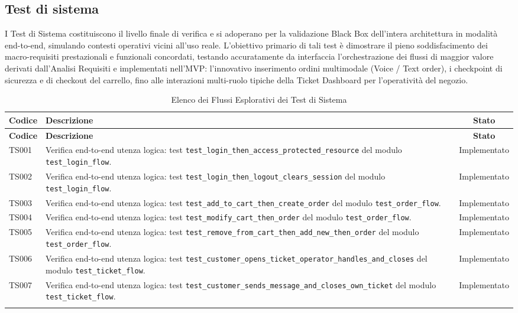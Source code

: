\documentclass[a4paper,11pt,oneside]{scrartcl}
\begin{document}
\subsection{Test di sistema}
I Test di Sistema costituiscono il livello finale di verifica e si adoperano per la validazione Black Box dell'intera architettura in modalità end-to-end, simulando contesti operativi vicini all'uso reale. L'obiettivo primario di tali test è dimostrare il pieno soddisfacimento dei macro-requisiti prestazionali e funzionali concordati, testando accuratamente da interfaccia l'orchestrazione dei flussi di maggior valore derivati dall'Analisi Requisiti e implementati nell'MVP: l'innovativo inserimento ordini multimodale (Voice / Text order), i checkpoint di sicurezza e di checkout del carrello, fino alle interazioni multi-ruolo tipiche della Ticket Dashboard per l'operatività del negozio.
\begin{longtable}{|p{1.9cm}|p{11.6cm}|c|}
    \hline
    \rowcolor[gray]{0.9}
    \textbf{Codice} & \textbf{Descrizione}                                                                                                                                            & \textbf{Stato} \\
    \hline
    \endfirsthead
    \hline
    \rowcolor[gray]{0.9}
    \textbf{Codice} & \textbf{Descrizione}                                                                                                                                            & \textbf{Stato} \\
    \hline
    \endhead
        TS001 & Verifica end-to-end utenza logica: test \texttt{test\_login\_then\_access\_protected\_resource} del modulo \texttt{test\_login\_flow}. & Implementato \\ \hline
    TS002 & Verifica end-to-end utenza logica: test \texttt{test\_login\_then\_logout\_clears\_session} del modulo \texttt{test\_login\_flow}. & Implementato \\ \hline
    TS003 & Verifica end-to-end utenza logica: test \texttt{test\_add\_to\_cart\_then\_create\_order} del modulo \texttt{test\_order\_flow}. & Implementato \\ \hline
    TS004 & Verifica end-to-end utenza logica: test \texttt{test\_modify\_cart\_then\_order} del modulo \texttt{test\_order\_flow}. & Implementato \\ \hline
    TS005 & Verifica end-to-end utenza logica: test \texttt{test\_remove\_from\_cart\_then\_add\_new\_then\_order} del modulo \texttt{test\_order\_flow}. & Implementato \\ \hline
    TS006 & Verifica end-to-end utenza logica: test \texttt{test\_customer\_opens\_ticket\_operator\_handles\_and\_closes} del modulo \texttt{test\_ticket\_flow}. & Implementato \\ \hline
    TS007 & Verifica end-to-end utenza logica: test \texttt{test\_customer\_sends\_message\_and\_closes\_own\_ticket} del modulo \texttt{test\_ticket\_flow}. & Implementato \\ \hline
    \caption{Elenco dei Flussi Esplorativi dei Test di Sistema}
\end{longtable}
\end{document}
